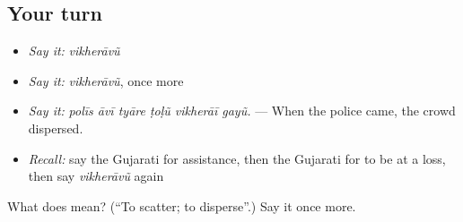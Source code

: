 \subsection*{Your turn}
\begin{itemize}
\raggedright
  \item \emph{Say it:} \emph{vikherāvũ}
  \item \emph{Say it:} \emph{vikherāvũ}, once more
  \item \emph{Say it:} \emph{polīs āvī tyāre ṭoḷũ vikherāī gayũ.} — When the police came, the crowd dispersed.
  \item \emph{Recall:} say the Gujarati for assistance, then the Gujarati for to be at a loss, then say \emph{vikherāvũ} again
\end{itemize}

\begin{tcolorbox}[breakable,colback=teal!4,colframe=teal!35!black,title={Before you move on}]
What does  mean? (\textquotedblleft{}To scatter; to disperse\textquotedblright{}.) Say it once more.
\end{tcolorbox}
